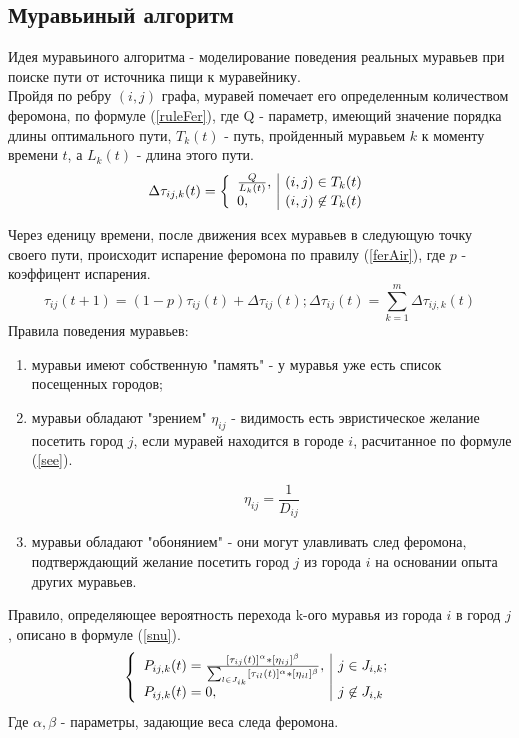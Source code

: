 \documentclass{article}
\begin{document}
		\subsection{Муравьиный алгоритм}
		Идея муравьиного алгоритма - моделирование поведения реальных муравьев при поиске пути от источника пищи к муравейнику. \cite{antAl}
		\\ \indent Пройдя по ребру $(i, j)$ графа, муравей помечает его определенным количеством феромона, по формуле (\ref{ruleFer}), где Q - параметр, имеющий значение порядка длины оптимального пути, $T_k(t)$ - путь, пройденный муравьем $k$ к моменту времени $t$, а $L_k(t)$ - длина этого пути.
\begin{equation}
	\Delta\tau_{ij,k}(t) = \left\{ \begin{array}{l | l}
		\frac{Q}{L_k(t)}, & (i,j)\in T_k(t)\\
		0, & (i,j)\not\in T_k(t)
	\end{array} \right.
\label{ruleFer}
\end{equation}

	\indent Через еденицу времени, после движения всех муравьев в следующую точку своего пути, происходит испарение феромона по правилу (\ref{ferAir}), где $p$ - коэффицент испарения.
\begin{equation}
	\tau_{ij}(t+1) = (1-p)\tau_{ij}(t)+\Delta\tau_{ij}(t); \Delta\tau_{ij}(t) = \sum_{k=1}^{m}\Delta\tau_{ij,k}(t)
\label{ferAir}
\end{equation}
	\indent Правила поведения муравьев:

\begin{enumerate}
	\item муравьи имеют собственную "память" - у муравья уже есть список посещенных городов;
	\item муравьи обладают "зрением" $\eta_{ij}$ - видимость есть эвристическое желание посетить город $j$, если муравей находится в городе $i$, расчитанное по формуле (\ref{see}). \par
	\begin{equation}
		\eta_{ij} = \frac{1}{D_{ij}}
	\label{see}
	\end{equation}
	\item муравьи обладают "обонянием" - они могут улавливать след феромона, подтверждающий желание посетить город $j$ из города $i$ на основании опыта других муравьев.
\end{enumerate}
Правило, определяющее вероятность перехода k-ого муравья из города $i$ в город $j$, описано в формуле (\ref{snu}).
\begin{equation}
	\left\{ \begin{array}{l | l}
		P_{ij,k}(t)=\frac{[\tau_{ij}(t)]^\alpha*[\eta_{ij}]^\beta}{\sum_{l\in J_{ik}}[\tau_{il}(t)]^\alpha * [\eta_{il}]^\beta}, & j \in J_{i,k};\\
		P_{ij,k}(t) = 0, & j \not\in J_{i,k}
	\end{array} \right.
	\label{snu}
\end{equation}
Где $\alpha,\beta$ - параметры, задающие веса следа феромона.\par
\end{document}
